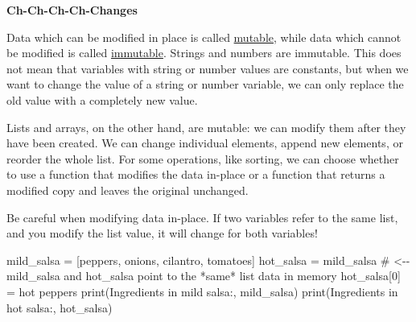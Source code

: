 \documentclass[
  letterpaper,
  DIV=11,
  numbers=noendperiod]{scrartcl}
\newenvironment{Shaded}{\begin{snugshade}}{\end{snugshade}}
\newcommand{\BuiltInTok}[1]{\textcolor[rgb]{0.00,0.23,0.31}{#1}}
\newcommand{\CommentTok}[1]{\textcolor[rgb]{0.37,0.37,0.37}{#1}}
\newcommand{\DecValTok}[1]{\textcolor[rgb]{0.68,0.00,0.00}{#1}}
\newcommand{\NormalTok}[1]{\textcolor[rgb]{0.00,0.23,0.31}{#1}}
\newcommand{\OperatorTok}[1]{\textcolor[rgb]{0.37,0.37,0.37}{#1}}
\newcommand{\StringTok}[1]{\textcolor[rgb]{0.13,0.47,0.30}{#1}}
\theoremstyle{remark}
\begin{document}
\begin{tcolorbox}[enhanced jigsaw, bottomrule=.15mm, rightrule=.15mm, colback=white, colframe=quarto-callout-color-frame, leftrule=.75mm, arc=.35mm, breakable, toprule=.15mm, left=2mm, opacityback=0]

\vspace{-3mm}\textbf{Ch-Ch-Ch-Ch-Changes}\vspace{3mm}

Data which can be modified in place is called
\href{../learners/reference.md\#mutable}{mutable}, while data which
cannot be modified is called
\href{../learners/reference.md\#immutable}{immutable}. Strings and
numbers are immutable. This does not mean that variables with string or
number values are constants, but when we want to change the value of a
string or number variable, we can only replace the old value with a
completely new value.

Lists and arrays, on the other hand, are mutable: we can modify them
after they have been created. We can change individual elements, append
new elements, or reorder the whole list. For some operations, like
sorting, we can choose whether to use a function that modifies the data
in-place or a function that returns a modified copy and leaves the
original unchanged.

Be careful when modifying data in-place. If two variables refer to the
same list, and you modify the list value, it will change for both
variables!

\begin{Shaded}
\begin{Highlighting}[]
\NormalTok{mild\_salsa }\OperatorTok{=}\NormalTok{ [}\StringTok{\textquotesingle{}peppers\textquotesingle{}}\NormalTok{, }\StringTok{\textquotesingle{}onions\textquotesingle{}}\NormalTok{, }\StringTok{\textquotesingle{}cilantro\textquotesingle{}}\NormalTok{, }\StringTok{\textquotesingle{}tomatoes\textquotesingle{}}\NormalTok{]}
\NormalTok{hot\_salsa }\OperatorTok{=}\NormalTok{ mild\_salsa        }\CommentTok{\# \textless{}{-}{-} mild\_salsa and hot\_salsa point to the *same* list data in memory}
\NormalTok{hot\_salsa[}\DecValTok{0}\NormalTok{] }\OperatorTok{=} \StringTok{\textquotesingle{}hot peppers\textquotesingle{}}
\BuiltInTok{print}\NormalTok{(}\StringTok{\textquotesingle{}Ingredients in mild salsa:\textquotesingle{}}\NormalTok{, mild\_salsa)}
\BuiltInTok{print}\NormalTok{(}\StringTok{\textquotesingle{}Ingredients in hot salsa:\textquotesingle{}}\NormalTok{, hot\_salsa)}
\end{Highlighting}
\end{Shaded}


\end{tcolorbox}
\end{document}
